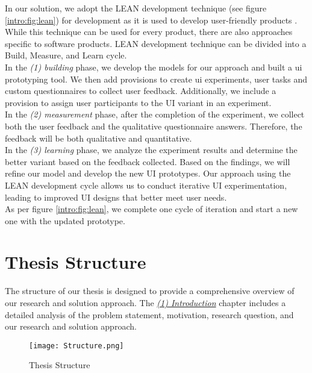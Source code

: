 In our solution, we adopt the LEAN development technique (see figure \ref{intro:fig:lean}) for development as it is used to develop user-friendly products \cite{article:lean:hart}.
While this technique can be used for every product, there are also approaches specific to software products.
LEAN development technique can be divided into a Build, Measure, and Learn cycle. \\
In the \textit{(1) building} phase, we develop the models for our approach and built a \ac{ui} prototyping tool. 
We then add provisions to create \ac{ui} experiments, user tasks and custom questionnaires to collect user feedback. 
Additionally, we include a provision to assign user participants to the UI variant in an experiment. \\
In the \textit{(2) measurement} phase, after the completion of the experiment, we collect both the user feedback and the qualitative questionnaire answers.
Therefore, the feedback will be both qualitative and quantitative.\\
In the \textit{(3) learning} phase, we analyze the experiment results and determine the better variant based on the feedback collected. 
Based on the findings, we will refine our model and develop the new UI prototypes. 
Our approach using the LEAN development cycle allows us to conduct iterative UI experimentation, leading to improved UI designs that better meet user needs. \\
As per figure \ref{intro:fig:lean}, we complete one cycle of iteration and start a new one with the updated prototype.

\clearpage

\section{Thesis Structure}
\label{introduction:section:structure}
The structure of our thesis is designed to provide a comprehensive overview of our research and solution approach.
The \textit{\hyperref[chap:introduction]{(1) Introduction}} chapter includes a detailed analysis of the problem statement, motivation, research question, and our research and solution approach.

\begin{figure}[htbp!]
    \centering
    \texttt{[image: Structure.png]}
    \caption{Thesis Structure}
    \label{intro:fig:structure}
\end{figure}


